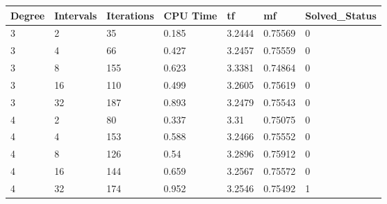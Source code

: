 \begin{tabular}{lllllll}
Degree & Intervals & Iterations & CPU Time & tf & mf & Solved_Status \\ 
\hline 
3 & 2 & 35 & 0.185 & 3.2444 & 0.75569 & 0 \\ 
3 & 4 & 66 & 0.427 & 3.2457 & 0.75559 & 0 \\ 
3 & 8 & 155 & 0.623 & 3.3381 & 0.74864 & 0 \\ 
3 & 16 & 110 & 0.499 & 3.2605 & 0.75619 & 0 \\ 
3 & 32 & 187 & 0.893 & 3.2479 & 0.75543 & 0 \\ 
4 & 2 & 80 & 0.337 & 3.31 & 0.75075 & 0 \\ 
4 & 4 & 153 & 0.588 & 3.2466 & 0.75552 & 0 \\ 
4 & 8 & 126 & 0.54 & 3.2896 & 0.75912 & 0 \\ 
4 & 16 & 144 & 0.659 & 3.2567 & 0.75572 & 0 \\ 
4 & 32 & 174 & 0.952 & 3.2546 & 0.75492 & 1 \\ 
\hline 
\end{tabular}